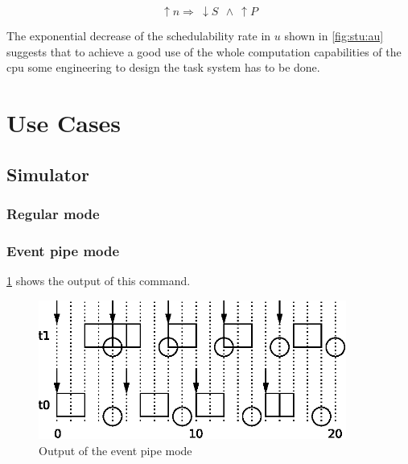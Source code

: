 \documentclass[a4paper,12pt]{article}
\begin{document}
\begin{equation}
	\uparrow n \Rightarrow ~\downarrow S ~~\land ~\uparrow P
	\label{eq:n influence}
\end{equation}


The exponential decrease of the schedulability rate in $u$ shown in \ref{fig:stu:au} suggests that
to achieve a good use of the whole computation capabilities of the cpu some engineering to design the task system has to be done.
\newpage\cleardoublepage{}
\section{Use Cases}
\label{sec:use}
\subsection{Simulator}


\subsubsection{Regular mode}




\subsubsection{Event pipe mode}


\ref{fig:use:1} shows the output of this command.

\begin{figure}
	\centering
	\includegraphics[width=0.9\textwidth]{../schedule/eps/1.eps}
	\caption{Output of the event pipe mode}
	\label{fig:use:1}
\end{figure}
\end{document}
